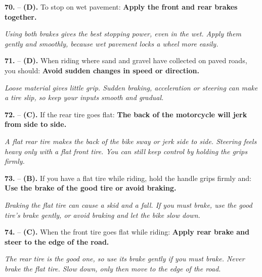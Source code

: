 \begin{minipage}{\linewidth}
\noindent\textbf{70.}  -- \textbf {(D).} To stop on wet pavement:  \textbf {Apply the front and rear brakes together.} \par \textit {Using both brakes gives the best stopping power, even in the wet. Apply them gently and smoothly, because wet pavement locks a wheel more easily.} \\
\end{minipage}

\begin{minipage}{\linewidth}
\noindent\textbf{71.}  -- \textbf {(D).} When riding where sand and gravel have collected on paved roads, you should:  \textbf {Avoid sudden changes in speed or direction.} \par \textit {Loose material gives little grip. Sudden braking, acceleration or steering can make a tire slip, so keep your inputs smooth and gradual.} \\
\end{minipage}

\begin{minipage}{\linewidth}
\noindent\textbf{72.}  -- \textbf {(C).} If the rear tire goes flat:  \textbf {The back of the motorcycle will jerk from side to side.} \par \textit {A flat rear tire makes the back of the bike sway or jerk side to side. Steering feels heavy only with a flat front tire. You can still keep control by holding the grips firmly.} \\
\end{minipage}

\begin{minipage}{\linewidth}
\noindent\textbf{73.}  -- \textbf {(B).} If you have a flat tire while riding, hold the handle grips firmly and:  \textbf {Use the brake of the good tire or avoid braking.} \par \textit {Braking the flat tire can cause a skid and a fall. If you must brake, use the good tire's brake gently, or avoid braking and let the bike slow down.} \\
\end{minipage}

\begin{minipage}{\linewidth}
\noindent\textbf{74.}  -- \textbf {(C).} When the front tire goes flat while riding:  \textbf {Apply rear brake and steer to the edge of the road.} \par \textit {The rear tire is the good one, so use its brake gently if you must brake. Never brake the flat tire. Slow down, only then move to the edge of the road.} \\
\end{minipage}

